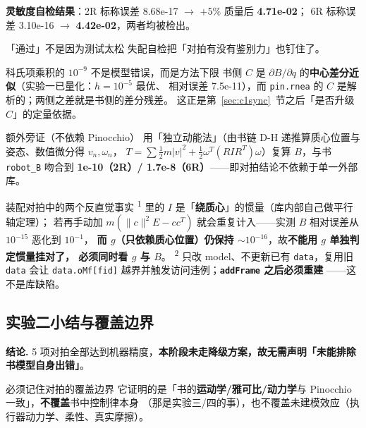 \documentclass[11pt,a4paper]{ctexart}
\newcommand{\stage}[1]{\textsuperscript{#1}}
\begin{document}
\textbf{灵敏度自检结果}：2R 标称误差 8.68e-17 $\to$ $+5\%$ 质量后 \textbf{4.71e-02}；
6R 标称误差 3.10e-16 $\to$ \textbf{4.42e-02}，两者均被检出。

\begin{keybox}{「通过」不是因为测试太松}
失配自检把「对拍有没有鉴别力」也钉住了。
\end{keybox}

\begin{warnbox}{科氏项乘积的 $10^{-9}$ 不是模型错误，而是方法下限}
书侧 $C$ 是 $\partial B/\partial q$ 的\textbf{中心差分近似}（实验一已量化：$h=10^{-5}$ 最优、
相对误差 7.5e-11），而 \texttt{pin.rnea} 的 $C$ 是解析的；两侧之差就是书侧的差分残差。
这正是第~\ref{sec:c1sync}~节之后「是否升级 $C$」的定量依据。
\end{warnbox}

\begin{keybox}{额外旁证（不依赖 Pinocchio）}
用「独立动能法」（由书链 D-H 递推算质心位置与姿态、数值微分得 $v_n,\omega_n$，
$T=\sum\frac12m|v|^2+\frac12\omega^{T}(RIR^{T})\omega$）复算 $B$，与书 \texttt{robot\_B} 吻合到
\textbf{1e-10（2R）/ 1.7e-8（6R）}——即对拍结论不依赖于单一外部库。
\end{keybox}

\begin{warnbox}{装配对拍中的两个反直觉事实}
\stage{1}  里的 $I$ 是「\textbf{绕质心}」的惯量（库内部自己做平行轴定理）；
若再手动加 $m(\|c\|^2E-cc^{T})$ 就会重复计入——实测 $B$ 相对误差从 $10^{-15}$ 恶化到 $10^{-1}$，
\textbf{而 $g$（只依赖质心位置）仍保持 $\sim10^{-16}$}，故\textbf{不能用 $g$ 单独判定惯量挂对了，
必须同时看 $g$ 与 $B$}。
\stage{2}  只改 model、不更新已有 \texttt{data}，复用旧 \texttt{data} 会让
\texttt{data.oMf[fid]} 越界并触发访问违例；\textbf{\texttt{addFrame} 之后必须重建
}——这不是库缺陷。
\end{warnbox}

\subsection{实验二小结与覆盖边界}

\textbf{结论.} 5 项对拍全部达到机器精度，\textbf{本阶段未走降级方案，故无需声明「未能排除书模型自身出错」}。

\begin{warnbox}{必须记住对拍的覆盖边界}
它证明的是「书的\textbf{运动学/雅可比/动力学}与 Pinocchio 一致」，\textbf{不覆盖}书中控制律本身
（那是实验三/四的事），也不覆盖未建模效应（执行器动力学、柔性、真实摩擦）。
\end{warnbox}
\end{document}
